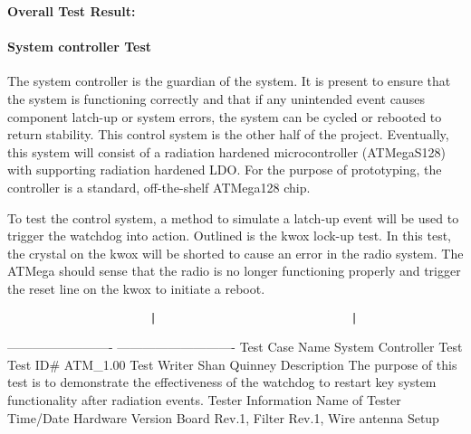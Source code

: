 \documentclass[]{article}
\let\oldparagraph\paragraph
\renewcommand{\paragraph}[1]{\oldparagraph{#1}\mbox{}}
\begin{document}
\textbf{Overall Test Result:}

\paragraph{System controller Test}\label{system-controller-test}

The system controller is the guardian of the system. It is present to
ensure that the system is functioning correctly and that if any
unintended event causes component latch-up or system errors, the system
can be cycled or rebooted to return stability. This control system is
the other half of the project. Eventually, this system will consist of a
radiation hardened microcontroller (ATMegaS128) with supporting
radiation hardened LDO. For the purpose of prototyping, the controller
is a standard, off-the-shelf ATMega128 chip.

To test the control system, a method to simulate a latch-up event will
be used to trigger the watchdog into action. Outlined is the kwox
lock-up test. In this test, the crystal on the kwox will be shorted to
cause an error in the radio system. The ATMega should sense that the
radio is no longer functioning properly and trigger the reset line on
the kwox to initiate a reboot.

\begin{verbatim}
                      |                              |
\end{verbatim}

------------------------- \textbar{} ----------------------------
\textbar{} Test Case Name \textbar{} System Controller Test \textbar{}
Test ID\# \textbar{} ATM\_1.00 \textbar{} Test Writer \textbar{} Shan
Quinney \textbar{} Description \textbar{} The purpose of this test is to
demonstrate the effectiveness of the watchdog to restart key system
functionality after radiation events. \textbar{} Tester Information
\textbar{} \textbar{} Name of Tester \textbar{} \textbar{} Time/Date
\textbar{} \textbar{} Hardware Version \textbar{} Board Rev.1, Filter
Rev.1, Wire antenna \textbar{} Setup \textbar{} \textbar{}
\end{document}
